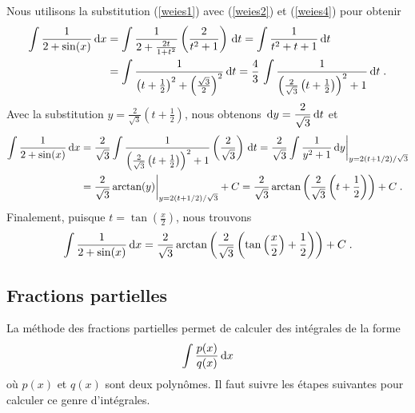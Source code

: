 {\begin{egg}
Nous utilisons la substitution (\ref{weies1}) avec (\ref{weies2}) et
(\ref{weies4}) pour obtenir
\begin{align*}
\int \frac{1}{2+\sin(x)} \,\mathrm{d}x
&= \int \frac{1}{2 + \frac{2t}{1+t^2}} \left(\frac{2}{t^2+1}\right) \,\mathrm{d}t
= \int \frac{1}{t^2+t+1} \,\mathrm{d}t \\
&= \int \frac{1}{ \left(t+\frac{1}{2}\right)^2 +
\left(\frac{\sqrt{3}}{2}\right)^2} \,\mathrm{d}t
= \frac{4}{3}\, \int
\frac{1}{\left(\frac{2}{\sqrt{3}}\left(t+\frac{1}{2}\right)\right)^2 + 1}
\,\mathrm{d}t \; .
\end{align*}
Avec la substitution
$\displaystyle y= \frac{2}{\sqrt{3}}\left(t+\frac{1}{2}\right)$, nous
obtenons
$\displaystyle \,\mathrm{d}y= \frac{2}{\sqrt{3}} \,\mathrm{d}t$ et
\begin{align*}
\int \frac{1}{2+\sin(x)} \,\mathrm{d}x &=
\frac{2}{\sqrt{3}}
\int \frac{1}{\left(\frac{2}{\sqrt{3}}\left(t+\frac{1}{2}\right)\right)^2 + 1}
\left( \frac{2}{\sqrt{3}} \right) \,\mathrm{d}t
= \frac{2}{\sqrt{3}}
\int \frac{1}{y^2+1} \,\mathrm{d}y\bigg|_{y=2\left(t+1/2\right)/\sqrt{3}} \\
&= \frac{2}{\sqrt{3}} \arctan(y) \bigg|_{y=2\left(t+1/2\right)/\sqrt{3}} + C
= \frac{2}{\sqrt{3}}
\arctan\left(\frac{2}{\sqrt{3}}\left(t+\frac{1}{2}\right)\right) +C
\; .
\end{align*}
Finalement, puisque $\displaystyle t = \tan\left(\frac{x}{2}\right)$, nous
trouvons
\[
\int \frac{1}{2+\sin(x)} \,\mathrm{d}x
= \frac{2}{\sqrt{3}}
\arctan\left(\frac{2}{\sqrt{3}}\left(\tan\left(\frac{x}{2}\right)
+\frac{1}{2}\right)\right) +C \; .
\]
\end{egg}

\subsection{Fractions partielles}

La méthode des fractions partielles permet de calculer des
intégrales de la forme
\[
\int \frac{p(x)}{q(x)}  \,\mathrm{d}x
\]
où $p(x)$ et $q(x)$ sont deux polynômes.  Il faut suivre les
étapes suivantes pour calculer ce genre d'intégrales.

}
